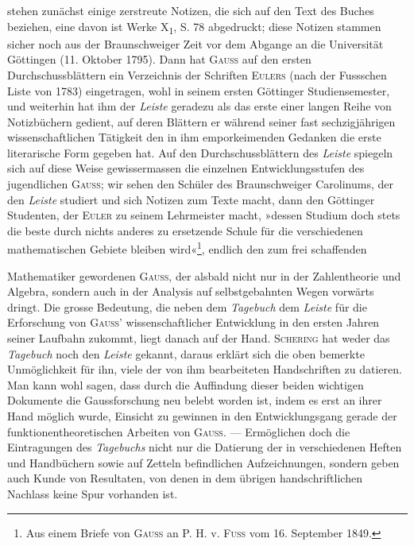 stehen zunächst einige zerstreute Notizen, die sich auf den Text des
Buches beziehen, eine davon ist Werke X\textsubscript{1}, S. 78 abgedruckt; diese Notizen
stammen sicher noch aus der Braunschweiger Zeit vor dem Abgange an die
Universität Göttingen (11. Oktober 1795). Dann hat \textsc{Gauss} auf den ersten
Durchschussblättern ein Verzeichnis der Schriften \textsc{Eulers} (nach der Fussschen
Liste von 1783) eingetragen, wohl in seinem ersten Göttinger Studiensemester, und
weiterhin hat ihm der \textit{Leiste} geradezu als das erste einer langen Reihe von
Notizbüchern gedient, auf deren Blättern er während seiner fast sechzigjährigen
wissenschaftlichen Tätigkeit den in ihm emporkeimenden Gedanken die erste
literarische Form gegeben hat. Auf den Durchschussblättern des \textit{Leiste} spiegeln
sich auf diese Weise gewissermassen die einzelnen Entwicklungsstufen des
jugendlichen \textsc{Gauss}; wir sehen den Schüler des Braunschweiger Carolinums,
der den \textit{Leiste} studiert und sich Notizen zum Texte macht, dann den Göttinger
Studenten, der \textsc{Euler} zu seinem Lehrmeister macht, »dessen Studium doch
stets die beste durch nichts anderes zu ersetzende Schule für die verschiedenen
mathematischen Gebiete bleiben wird«\footnote{Aus einem Briefe von \textsc{Gauss} an P. H. v. \textsc{Fuss} vom 16. September 1849.}, endlich den zum frei schaffenden\par
\clearpage{}
\noindent Mathematiker gewordenen \textsc{Gauss}, der alsbald nicht nur in der Zahlentheorie
und Algebra, sondern auch in der Analysis auf selbstgebahnten Wegen vorwärts
dringt. Die grosse Bedeutung, die neben dem \textit{Tagebuch} dem \textit{Leiste} für
die Erforschung von \textsc{Gauss}’ wissenschaftlicher Entwicklung in den ersten Jahren
seiner Laufbahn zukommt, liegt danach auf der Hand. \textsc{Schering} hat weder
das \textit{Tagebuch} noch den \textit{Leiste} gekannt, daraus erklärt sich die oben bemerkte
Unmöglichkeit für ihn, viele der von ihm bearbeiteten Handschriften zu datieren.
Man kann wohl sagen, dass durch die Auffindung dieser beiden
wichtigen Dokumente die Gaussforschung neu belebt worden ist, indem es
erst an ihrer Hand möglich wurde, Einsicht zu gewinnen in den Entwicklungsgang
gerade der funktionentheoretischen Arbeiten von \textsc{Gauss}. — Ermöglichen
doch die Eintragungen des \textit{Tagebuchs} nicht nur die Datierung der in verschiedenen
Heften und Handbüchern sowie auf Zetteln befindlichen Aufzeichnungen,
sondern geben auch Kunde von Resultaten, von denen in dem übrigen
handschriftlichen Nachlass keine Spur vorhanden ist.

